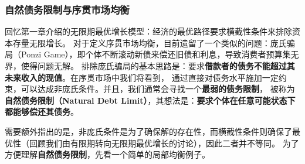 \subsubsection{自然债务限制与序贯市场均衡}

回忆第一章介绍的无限期最优增长模型：经济的最优路径要求横截性条件来排除资本存量无限增长。
对于定义序贯市场均衡，目前遗留了一个类似的问题：庞氏骗局（Ponzi Game），即个体不断滚动新债来偿还旧债和利息，导致消费者预算集无界，使得问题无解。
排除庞氏骗局的基本思路是：要求\textbf{借款者的债务不能超过其未来收入的现值}。在序贯市场中我们将看到，
通过直接对债务水平施加一定约束，可以达成非庞氏条件。并且，我们通常会寻找一个\textbf{最弱的债务限制}，
被称为\textbf{自然债务限制（Natural Debt Limit）}，其想法是：\textbf{要求个体在任意可能状态下都能够偿还其债务}。

需要额外指出的是，非庞氏条件是为了确保解的存在性，而横截性条件则确保了最优性（回顾我们由有限期转向无限期最优增长的讨论），因此二者并不等同。
为了方便理解\textbf{自然债务限制}，先看一个简单的局部均衡例子。
